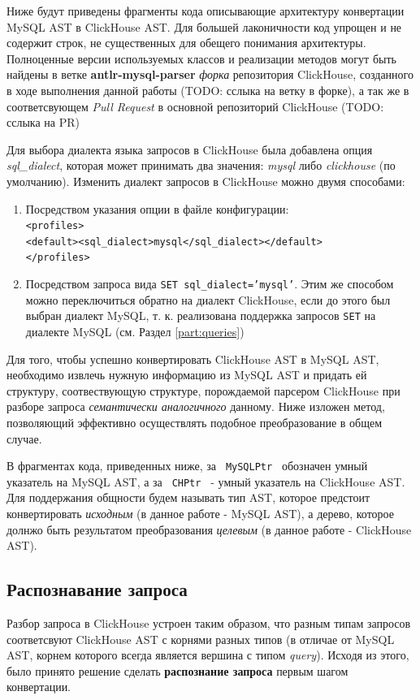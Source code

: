Ниже будут приведены фрагменты кода описывающие архитектуру конвертации MySQL AST в ClickHouse AST. Для большей лаконичности код упрощен и не содержит строк, не существенных для обещего понимания архитектуры. Полноценные версии используемых классов и реализации методов могут быть найдены в ветке \textbf{antlr-mysql-parser} \textit{форка} репозитория ClickHouse, созданного в ходе выполнения данной работы (TODO: сслыка на ветку в форке), а так же в соответсвующем \textit{Pull Request} в основной репозиторий ClickHouse (TODO: сслыка на PR)

Для выбора диалекта языка запросов в ClickHouse была добавлена опция \textit{sql\_dialect}, которая может принимать два значения: \textit{mysql} либо \textit{clickhouse} (по умолчанию). Изменить диалект запросов в ClickHouse можно двумя способами:

\begin{enumerate}
    \item Посредством указания опции в файле конфигурации:\\ \texttt{<profiles>}\\\texttt{<default><sql_dialect>mysql</sql_dialect></default>}\\ \texttt{</profiles>}
    \item Посредством запроса вида \texttt{SET sql_dialect='mysql'}. Этим же способом можно переключиться обратно на диалект ClickHouse, если до этого был выбран диалект MySQL, т. к. реализована поддержка запросов \texttt{SET} на диалекте MySQL (см. Раздел \ref{part:queries})
\end{enumerate}

Для того, чтобы успешно конвертировать ClickHouse AST в MySQL AST, необходимо извлечь нужную информацию из MySQL AST и придать ей структуру, соотвествующую структуре, порождаемой парсером ClickHouse при разборе запроса \textit{семантически аналогичного} данному. Ниже изложен метод, позволяющий эффективно осуществлять подобное преобразование в общем случае.

В фрагментах кода, приведенных ниже, за \texttt{ MySQLPtr } обозначен умный указатель на MySQL AST, а за \texttt{ CHPtr } - умный указатель на ClickHouse AST. Для поддержания общности будем называть тип AST, которое предстоит конвертировать \textit{исходным} (в данное работе - MySQL AST), а дерево, которое долнжо быть результатом преобразования \textit{целевым} (в данное работе - ClickHouse AST).

\subsection{Распознавание запроса} \label{conv:recognizer_}
Разбор запроса в ClickHouse устроен таким образом, что разным типам запросов соответсвуют ClickHouse AST с корнями разных типов (в отличае от MySQL AST, корнем которого всегда является вершина с типом \textit{query}). Исходя из этого, было принято решение сделать \textbf{распознание запроса} первым шагом конвертации.

